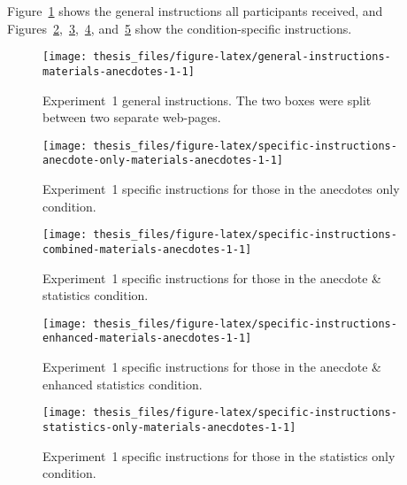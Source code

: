 \documentclass[a4paper, nobind]{templates/ociamthesis}
\theoremstyle{definition}
\theoremstyle{definition}
\theoremstyle{definition}
\theoremstyle{definition}
\theoremstyle{remark}
\begin{document}
Figure~\ref{fig:general-instructions-materials-anecdotes-1} shows the general
instructions all participants received, and
Figures~\ref{fig:specific-instructions-anecdote-only-materials-anecdotes-1},~\ref{fig:specific-instructions-combined-materials-anecdotes-1},~\ref{fig:specific-instructions-enhanced-materials-anecdotes-1},
and~\ref{fig:specific-instructions-statistics-only-materials-anecdotes-1} show
the condition-specific instructions.



\begin{figure}
\texttt{[image: thesis\_files/figure-latex/general-instructions-materials-anecdotes-1-1]} \caption{Experiment~1 general instructions. The two boxes were split between two separate web-pages.}\label{fig:general-instructions-materials-anecdotes-1}
\end{figure}



\begin{figure}
\texttt{[image: thesis\_files/figure-latex/specific-instructions-anecdote-only-materials-anecdotes-1-1]} \caption{Experiment~1 specific instructions for those in the anecdotes only condition.}\label{fig:specific-instructions-anecdote-only-materials-anecdotes-1}
\end{figure}



\begin{figure}
\texttt{[image: thesis\_files/figure-latex/specific-instructions-combined-materials-anecdotes-1-1]} \caption{Experiment~1 specific instructions for those in the anecdote \& statistics condition.}\label{fig:specific-instructions-combined-materials-anecdotes-1}
\end{figure}



\begin{figure}
\texttt{[image: thesis\_files/figure-latex/specific-instructions-enhanced-materials-anecdotes-1-1]} \caption{Experiment~1 specific instructions for those in the anecdote \& enhanced statistics condition.}\label{fig:specific-instructions-enhanced-materials-anecdotes-1}
\end{figure}



\begin{figure}
\texttt{[image: thesis\_files/figure-latex/specific-instructions-statistics-only-materials-anecdotes-1-1]} \caption{Experiment~1 specific instructions for those in the statistics only condition.}\label{fig:specific-instructions-statistics-only-materials-anecdotes-1}
\end{figure}
\end{document}
